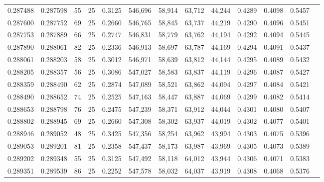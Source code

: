 \begin{tabular}{rrrrrrrrrrrrr}
0.287488 & 0.287598 &    55 &  25 &                                     0.3125 & 546,696 &  58,914 &  63,712 &  44,244 & 0.4289 & 0.4098 & 0.5457 \\
0.287600 & 0.287752 &    69 &  25 &                                     0.2660 & 546,765 &  58,845 &  63,737 &  44,219 & 0.4290 & 0.4096 & 0.5451 \\
0.287753 & 0.287889 &    66 &  25 &                                     0.2747 & 546,831 &  58,779 &  63,762 &  44,194 & 0.4292 & 0.4094 & 0.5445 \\
0.287890 & 0.288061 &    82 &  25 &                                     0.2336 & 546,913 &  58,697 &  63,787 &  44,169 & 0.4294 & 0.4091 & 0.5437 \\
0.288061 & 0.288203 &    58 &  25 &                                     0.3012 & 546,971 &  58,639 &  63,812 &  44,144 & 0.4295 & 0.4089 & 0.5432 \\
0.288205 & 0.288357 &    56 &  25 &                                     0.3086 & 547,027 &  58,583 &  63,837 &  44,119 & 0.4296 & 0.4087 & 0.5427 \\
0.288359 & 0.288490 &    62 &  25 &                                     0.2874 & 547,089 &  58,521 &  63,862 &  44,094 & 0.4297 & 0.4084 & 0.5421 \\
0.288490 & 0.288652 &    74 &  25 &                                     0.2525 & 547,163 &  58,447 &  63,887 &  44,069 & 0.4299 & 0.4082 & 0.5414 \\
0.288653 & 0.288798 &    76 &  25 &                                     0.2475 & 547,239 &  58,371 &  63,912 &  44,044 & 0.4301 & 0.4080 & 0.5407 \\
0.288802 & 0.288945 &    69 &  25 &                                     0.2660 & 547,308 &  58,302 &  63,937 &  44,019 & 0.4302 & 0.4077 & 0.5401 \\
0.288946 & 0.289052 &    48 &  25 &                                     0.3425 & 547,356 &  58,254 &  63,962 &  43,994 & 0.4303 & 0.4075 & 0.5396 \\
0.289053 & 0.289201 &    81 &  25 &                                     0.2358 & 547,437 &  58,173 &  63,987 &  43,969 & 0.4305 & 0.4073 & 0.5389 \\
0.289202 & 0.289348 &    55 &  25 &                                     0.3125 & 547,492 &  58,118 &  64,012 &  43,944 & 0.4306 & 0.4071 & 0.5383 \\
0.289351 & 0.289539 &    86 &  25 &                                     0.2252 & 547,578 &  58,032 &  64,037 &  43,919 & 0.4308 & 0.4068 & 0.5376 \\

\end{tabular}
